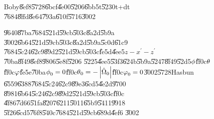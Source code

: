 \documentclass[12pt,a4paper]{article}
\begin{document}
\begin{figure}[th]
\caption{Boby\U{8ef8}\U{5728}\U{6bcf}\U{4e00}\U{5206}\U{6bb5}t\U{5230}t+dt%
\U{7684}\U{8ffd}\U{8e64}\U{793a}\U{610f}\U{5716}\U{3002}}
\begin{center}
\fbox{}
\end{center}
\end{figure}

\begin{figure}[th]
\caption{\U{9640}\U{87ba}\U{7684}\U{521d}\U{59cb}\U{503c}\U{8a2d}\U{5b9a}%
\U{3002}\U{6b64}\U{521d}\U{59cb}\U{503c}\U{8a2d}\U{5b9a}\U{5c0d}\U{61c9}%
\U{7684}\U{5c24}\U{62c9}\U{89d2}\U{521d}\U{59cb}\U{503c}\U{fe5d}\U{4ee5}$%
z-x^{\prime }-z^{\prime }$\U{70ba}\U{8f49}\U{8ef8}\U{9806}\U{5e8f}\U{5206}%
\U{5225}\U{4ee5}\U{53f3}\U{624b}\U{5b9a}\U{5247}\U{8f49}\U{52d5}$\protect%
\phi $\U{ff0c}$\protect\theta $\U{ff0c}$\protect\varphi $\U{fe5e}\U{70ba}$%
\protect\phi _{0}=0$\U{ff0c}$\protect\theta _{0}=-\left\vert \hat{\Omega}%
_{0}\right\vert $\U{ff0c}$\protect\varphi _{0}=0$\U{3002}\U{5728}Hasbun%
\U{6559}\U{6388}\U{7684}\U{5c24}\U{62c9}\U{89e3}\U{6cd5}\U{4e2d}\U{9700}%
\U{8981}\U{6b64}\U{5c24}\U{62c9}\U{89d2}\U{521d}\U{59cb}\U{503c}\U{ff0c}%
\U{4f86}\U{7d66}\U{51fa}\U{8207}\U{6211}\U{5011}\U{65b9}\U{5411}\U{9918}%
\U{5f26}\U{6cd5}\U{76f8}\U{540c}\U{7684}\U{521d}\U{59cb}\U{689d}\U{4ef6}%
\U{3002}}
\begin{center}
\fbox{}
\end{center}
\end{figure}
\end{document}
